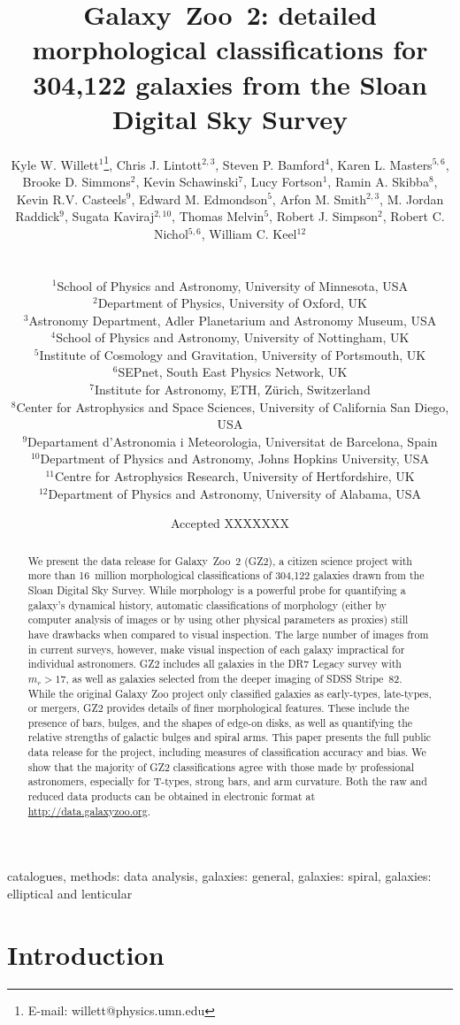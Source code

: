 \documentclass[useAMS,usenatbib]{mn2e}
\title[Galaxy Zoo 2 data release]{Galaxy~Zoo~2: detailed morphological classifications for 304,122 galaxies from the Sloan Digital Sky Survey}
\author[Willett et al.]{
  \parbox[t]{16cm}{
  Kyle W. Willett$^{1}$\thanks{E-mail: willett@physics.umn.edu},
  Chris J. Lintott$^{2,3}$,
  Steven P. Bamford$^{4}$,
  Karen L. Masters$^{5,6}$,
  Brooke D. Simmons$^{2}$,
  Kevin Schawinski$^{7}$,
  Lucy Fortson$^{1}$,
  Ramin A. Skibba$^{8}$,
  Kevin R.V. Casteels$^{9}$,
  Edward M. Edmondson$^{5}$,
  Arfon M. Smith$^{2,3}$,
  M. Jordan Raddick$^{9}$,
  Sugata Kaviraj$^{2,10}$,
  Thomas Melvin$^{5}$,
  Robert J. Simpson$^{2}$,
  Robert C. Nichol$^{5,6}$,
  William C. Keel$^{12}$
  \\
  }\\
$^{1}$School of Physics and Astronomy, University of Minnesota, USA \\
$^{2}$Department of Physics, University of Oxford, UK \\
$^{3}$Astronomy Department, Adler Planetarium and Astronomy Museum, USA \\
$^{4}$School of Physics and Astronomy, University of Nottingham, UK \\
$^{5}$Institute of Cosmology and Gravitation, University of Portsmouth, UK \\
$^{6}$SEPnet, South East Physics Network, UK \\
$^{7}$Institute for Astronomy, ETH, Z\"urich, Switzerland \\
$^{8}$Center for Astrophysics and Space Sciences, University of California San Diego, USA \\
$^{9}$Departament d'Astronomia i Meteorologia, Universitat de Barcelona, Spain \\
$^{10}$Department of Physics and Astronomy, Johns Hopkins University, USA \\
$^{11}$Centre for Astrophysics Research, University of Hertfordshire, UK \\
$^{12}$Department of Physics and Astronomy, University of Alabama, USA \\
}
\begin{document}
\date{Accepted XXXXXXX}

\pagerange{\pageref{firstpage}--\pageref{lastpage}} 

\maketitle

\label{firstpage}

\begin{abstract}
We present the data release for Galaxy~Zoo~2 (GZ2), a citizen science project with more than 16~million morphological classifications of 304,122 galaxies drawn from the Sloan Digital Sky Survey. While morphology is a powerful probe for quantifying a galaxy's dynamical history, automatic classifications of morphology (either by computer analysis of images or by using other physical parameters as proxies) still have drawbacks when compared to visual inspection. The large number of images from in current surveys, however, make visual inspection of each galaxy impractical for individual astronomers. GZ2 includes all galaxies in the DR7 Legacy survey with $m_r>17$, as well as galaxies selected from the deeper imaging of SDSS Stripe~82. While the original Galaxy Zoo project only classified galaxies as early-types, late-types, or mergers, GZ2 provides details of finer morphological features. These include the presence of bars, bulges, and the shapes of edge-on disks, as well as quantifying the relative strengths of galactic bulges and spiral arms. This paper presents the full public data release for the project, including measures of classification accuracy and bias. We show that the majority of GZ2 classifications agree with those made by professional astronomers, especially for T-types, strong bars, and arm curvature. Both the raw and reduced data products can be obtained in electronic format at \url{http://data.galaxyzoo.org}.
\end{abstract}

\begin{keywords}
catalogues, methods: data analysis, galaxies: general, galaxies: spiral, galaxies: elliptical and lenticular
\end{keywords}


\section{Introduction} \label{sec-intro}
\end{document}
